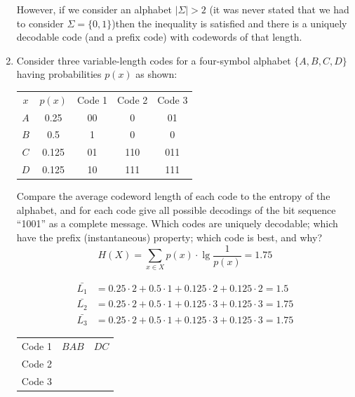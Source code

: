 \documentclass[10pt,\jkfside,a4paper]{article}
\begin{document}
\begin{enumerate}
    However, if we consider an alphabet $|\Sigma| > 2$ (it was never stated that we had to consider $\Sigma = \{0, 1\}$)then the inequality is satisfied and there is a uniquely decodable code (and a prefix code)
    with codewords of that length.

    \item Consider three variable-length codes for a four-symbol alphabet $\{A, B, C, D\}$ having probabilities $p(x)$ as shown:
    \begin{table}[H]

        \centering

        \begin{tabular}{c|c|c|c|c}
            $x$ & $p(x)$ & Code 1 & Code 2 & Code 3 \\
            $A$ & 0.25 & 00 & 0 & 01 \\
            $B$ & 0.5 & 1 & 0 & 0 \\
            $C$ & 0.125 & 01 & 110 & 011 \\
            $D$ & 0.125 & 10 & 111 & 111
        \end{tabular}

    \end{table}

    Compare the average codeword length of each code to the entropy of the alphabet, and for each code give all possible decodings of the bit sequence ``1001'' as a complete message. Which codes are uniquely
    decodable; which have the prefix (instantaneous) property; which code is best, and why?
    \[
        H(X) = \sum_{x \in X} p(x) \cdot \lg \frac{1}{p(x)} = 1.75
    \]

    \begin{align}
        \bar{L_1} &= 0.25 \cdot 2 + 0.5 \cdot 1 + 0.125 \cdot 2 + 0.125 \cdot 2 = 1.5 \\
        \bar{L_2} &= 0.25 \cdot 2 + 0.5 \cdot 1 + 0.125 \cdot 3 + 0.125 \cdot 3 = 1.75 \\
        \bar{L_3} &= 0.25 \cdot 2 + 0.5 \cdot 1 + 0.125 \cdot 3 + 0.125 \cdot 3 = 1.75
    \end{align}

    \begin{table}[H]

        \centering

        \begin{tabular}{c|cc}
            Code 1 & $BAB$ & $DC$ \\
            Code 2 & \\
            Code 3 & \\
        \end{tabular}


\end{table}
\end{enumerate}
\end{document}
